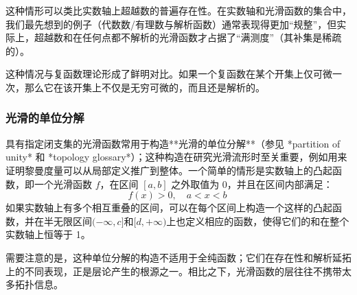 这种情形可以类比实数轴上超越数的普遍存在性。在实数轴和光滑函数的集合中，我们最先想到的例子（代数数/有理数与解析函数）通常表现得更加“规整”，但实际上，超越数和在任何点都不解析的光滑函数才占据了“满测度”（其补集是稀疏的）。

这种情况与复函数理论形成了鲜明对比。如果一个复函数在某个开集上仅可微一次，那么它在该开集上不仅是无穷可微的，而且还是解析的。
\subsubsection{光滑的单位分解}
具有指定闭支集的光滑函数常用于构造**光滑的单位分解**（参见 *partition of unity* 和 *topology glossary*）；这种构造在研究光滑流形时至关重要，例如用来证明黎曼度量可以从局部定义推广到整体。一个简单的情形是实数轴上的凸起函数，即一个光滑函数 $f$，在区间 $[a,b]$ 之外取值为 0，并且在区间内部满足：
$$
f(x) > 0, \quad a < x < b~
$$
如果实数轴上有多个相互重叠的区间，可以在每个区间上构造一个这样的凸起函数，并在半无限区间$(-\infty, c]$和$[d, +\infty)$上也定义相应的函数，使得它们的和在整个实数轴上恒等于 1。

需要注意的是，这种单位分解的构造不适用于全纯函数；它们在存在性和解析延拓上的不同表现，正是层论产生的根源之一。相比之下，光滑函数的层往往不携带太多拓扑信息。
